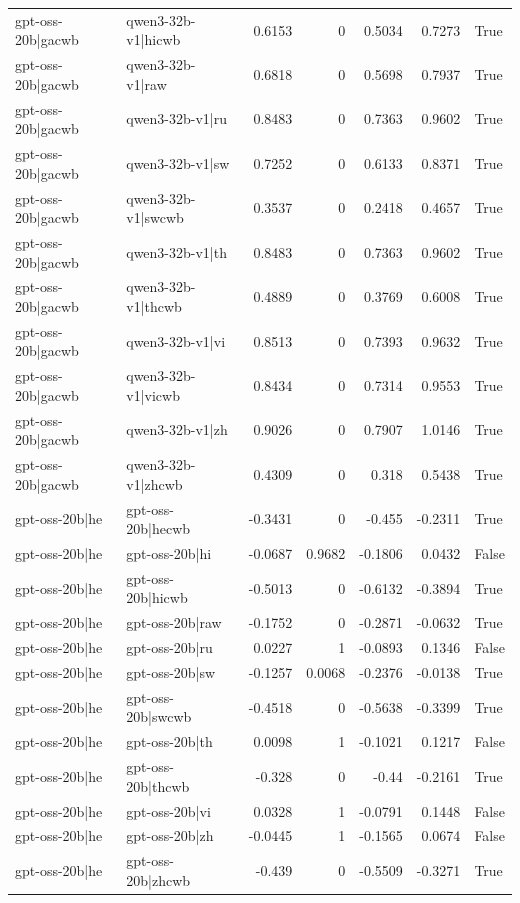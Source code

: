 \begin{table}
\begin{tabular}{l l r r r r l}
gpt-oss-20b|gacwb & qwen3-32b-v1|hicwb & 0.6153 & 0 & 0.5034 & 0.7273 & True \\
gpt-oss-20b|gacwb & qwen3-32b-v1|raw & 0.6818 & 0 & 0.5698 & 0.7937 & True \\
gpt-oss-20b|gacwb & qwen3-32b-v1|ru & 0.8483 & 0 & 0.7363 & 0.9602 & True \\
gpt-oss-20b|gacwb & qwen3-32b-v1|sw & 0.7252 & 0 & 0.6133 & 0.8371 & True \\
gpt-oss-20b|gacwb & qwen3-32b-v1|swcwb & 0.3537 & 0 & 0.2418 & 0.4657 & True \\
gpt-oss-20b|gacwb & qwen3-32b-v1|th & 0.8483 & 0 & 0.7363 & 0.9602 & True \\
gpt-oss-20b|gacwb & qwen3-32b-v1|thcwb & 0.4889 & 0 & 0.3769 & 0.6008 & True \\
gpt-oss-20b|gacwb & qwen3-32b-v1|vi & 0.8513 & 0 & 0.7393 & 0.9632 & True \\
gpt-oss-20b|gacwb & qwen3-32b-v1|vicwb & 0.8434 & 0 & 0.7314 & 0.9553 & True \\
gpt-oss-20b|gacwb & qwen3-32b-v1|zh & 0.9026 & 0 & 0.7907 & 1.0146 & True \\
gpt-oss-20b|gacwb & qwen3-32b-v1|zhcwb & 0.4309 & 0 & 0.318 & 0.5438 & True \\
gpt-oss-20b|he & gpt-oss-20b|hecwb & -0.3431 & 0 & -0.455 & -0.2311 & True \\
gpt-oss-20b|he & gpt-oss-20b|hi & -0.0687 & 0.9682 & -0.1806 & 0.0432 & False \\
gpt-oss-20b|he & gpt-oss-20b|hicwb & -0.5013 & 0 & -0.6132 & -0.3894 & True \\
gpt-oss-20b|he & gpt-oss-20b|raw & -0.1752 & 0 & -0.2871 & -0.0632 & True \\
gpt-oss-20b|he & gpt-oss-20b|ru & 0.0227 & 1 & -0.0893 & 0.1346 & False \\
gpt-oss-20b|he & gpt-oss-20b|sw & -0.1257 & 0.0068 & -0.2376 & -0.0138 & True \\
gpt-oss-20b|he & gpt-oss-20b|swcwb & -0.4518 & 0 & -0.5638 & -0.3399 & True \\
gpt-oss-20b|he & gpt-oss-20b|th & 0.0098 & 1 & -0.1021 & 0.1217 & False \\
gpt-oss-20b|he & gpt-oss-20b|thcwb & -0.328 & 0 & -0.44 & -0.2161 & True \\
gpt-oss-20b|he & gpt-oss-20b|vi & 0.0328 & 1 & -0.0791 & 0.1448 & False \\
gpt-oss-20b|he & gpt-oss-20b|zh & -0.0445 & 1 & -0.1565 & 0.0674 & False \\
gpt-oss-20b|he & gpt-oss-20b|zhcwb & -0.439 & 0 & -0.5509 & -0.3271 & True \\

\end{tabular}
\end{table}
